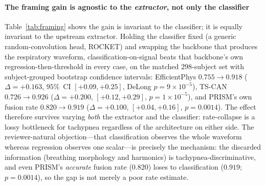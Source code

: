 

\paragraph{The framing gain is agnostic to the \emph{extractor}, not only the classifier}
Table~\ref{tab:framing} shows the gain is invariant to the classifier; it is equally invariant to
the upstream extractor. Holding the classifier fixed (a generic random-convolution head, ROCKET)
and swapping the backbone that produces the respiratory waveform, classification-on-signal beats
that backbone's own regression-then-threshold in every case, on the matched $298$-subject set with
subject-grouped bootstrap confidence intervals: EfficientPhys $0.755\!\rightarrow\!0.918$
($\Delta{=}{+}0.163$, $95\%$~CI $[{+}0.09,{+}0.25]$, DeLong $p{=}9\times10^{-5}$), TS-CAN
$0.726\!\rightarrow\!0.926$ ($\Delta{=}{+}0.200$, $[{+}0.12,{+}0.29]$, $p{=}1\times10^{-5}$), and
PRISM's own fusion rate $0.820\!\rightarrow\!0.919$ ($\Delta{=}{+}0.100$, $[{+}0.04,{+}0.16]$,
$p{=}0.0014$). The effect therefore survives varying \emph{both} the extractor and the classifier:
rate-collapse is a lossy bottleneck for tachypnea regardless of the architecture on either side.
The reviewer-natural objection---that classification observes the whole waveform whereas regression
observes one scalar---is precisely the mechanism: the discarded information (breathing morphology and
harmonics) is tachypnea-discriminative, and even PRISM's \emph{accurate} fusion rate ($0.820$) loses
to classification ($0.919$; $p{=}0.0014$), so the gap is not merely a poor rate estimate.

